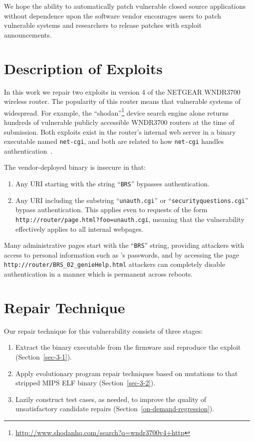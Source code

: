 \documentclass{sigcomm-alternate}
\begin{document}
We hope the ability to automatically patch vulnerable closed source
applications without dependence upon the software vendor encourages
users to patch vulnerable systems and researchers to release patches
with exploit announcements.

\section{Description of Exploits}
\label{sec-2}
In this work we repair two exploits in version 4 of the NETGEAR WNDR3700
wireless router. The popularity of this router means that vulnerable
systems of widespread. For example, the
``shodan''\footnote{\url{http://www.shodanhq.com/search?q=wndr3700v4+http}}
device search engine alone returns hundreds of vulnerable publicly
accessible WNDR3700 routers at the time of submission. 
Both exploits exist in the router's internal web server in a binary
executable named \texttt{net-cgi}, and both are related to how
\texttt{net-cgi} handles authentication~\cite{zcutlip}.

The vendor-deployed binary is insecure in that: 
\begin{enumerate}
\item Any URI starting with the string ``{\tt BRS}'' bypasses authentication.

\item Any URI including the substring ``{\tt unauth.cgi}'' or
  ``{\tt securityquestions.cgi}'' bypass authentication. This applies
  even to requests of the form 
  \texttt{http://router/page.html?foo=unauth.cgi}, meaning that 
  the vulnerability effectively applies to all internal webpages. 
\end{enumerate}

Many administrative pages start with the ``{\tt BRS}'' string, providing
attackers with access to personal information such as 's
passwords, and by accessing the page
\texttt{http://router/BRS\_02\_genieHelp.html} attackers can
completely disable authentication in a manner which is permanent
across reboots.

\section{Repair Technique}
\label{sec-3}

Our repair technique for this vulnerability consists of three stages:
\begin{enumerate}
\item Extract the binary executable from the firmware and reproduce
the exploit (Section~\ref{sec-3-1}).
\item Apply evolutionary program repair techniques based on mutations to
that stripped MIPS ELF binary (Section~\ref{sec-3-2}). 
\item Lazily construct test cases, as needed, to improve the quality of
unsatisfactory candidate repairs (Section~\ref{on-demand-regression}). 
\end{enumerate} 
\end{document}
